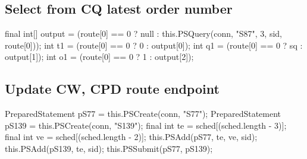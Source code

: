 \subsection{Select from CQ latest order number}
\nwenddocs{}\endmoddef{}
final int[] output = (route[0] == 0 ? null : this.PSQuery(conn, "S87", 3, sid, route[0]));
int t1 = (route[0] == 0 ?  0 : output[0]);
int q1 = (route[0] == 0 ? sq : output[1]);
int o1 = (route[0] == 0 ?  1 : output[2]);
\nwendcode{}\nwdocspar

\subsection{Update CW, CPD route endpoint}
\nwenddocs{}\endmoddef{}
PreparedStatement pS77 = this.PSCreate(conn, "S77");
PreparedStatement pS139 = this.PSCreate(conn, "S139");
final int te = sched[(sched.length - 3)];
final int ve = sched[(sched.length - 2)];
this.PSAdd(pS77, te, ve, sid);
this.PSAdd(pS139, te, sid);
this.PSSubmit(pS77, pS139);
\nwendcode{}\nwdocspar

